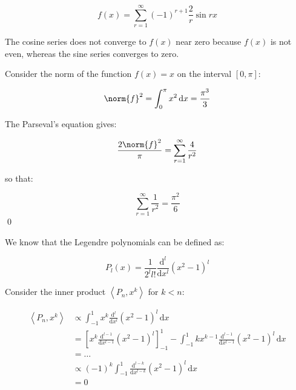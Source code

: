 \documentclass[12pt]{article}
\begin{document}
\begin{equation}
    f(x) = \sum_{r = 1}^{\infty} (-1)^{r + 1} \frac{2}{r} \sin{rx}
\end{equation}

The cosine series does not converge to $f(x)$ near zero because $f(x)$ is not even, whereas the sine series converges to zero.

Consider the norm of the function $f(x) = x$ on the interval $[0, \pi]$:

\begin{equation}
    \norm{f}^{2} = \int_{0}^{\pi} x^{2} \, \mathrm{d}x = \frac{\pi^{3}}{3}
\end{equation}

The Parseval's equation gives:

\begin{equation}
    \frac{2\norm{f}^{2}}{\pi} = \sum_{r = 1}^{\infty} \frac{4}{r^{2}}
\end{equation}

so that:

\begin{equation}
    \sum_{r = 1}^{\infty} \frac{1}{r^{2}} = \frac{\pi^{2}}{6}
\end{equation}
\qed



We know that the Legendre polynomials can be defined as:

\begin{equation}
    P_{l}(x) = \frac{1}{2^{l} l!} \frac{\mathrm{d}^{l}}{\mathrm{d}x^{l}} (x^{2} - 1)^{l}
\end{equation}

Consider the inner product $\left\langle P_{n}, x^{k} \right\rangle$ for $k < n$:

\begin{equation}
\begin{split}
    \left\langle P_{n}, x^{k} \right\rangle &\propto \int_{-1}^{1} x^{k} \frac{\mathrm{d}^{l}}{\mathrm{d}x^{l}} (x^{2} - 1)^{l} \, \mathrm{d}x \\
    &= \left[ x^{k} \frac{\mathrm{d}^{l - 1}}{\mathrm{d}x^{l - 1}} (x^{2} - 1)^{l} \right]_{-1}^{1} - \int_{-1}^{1} k x^{k - 1} \frac{\mathrm{d}^{l - 1}}{\mathrm{d}x^{l - 1}} (x^{2} - 1)^{l} \, \mathrm{d}x \\
    &= \dots \\
    &\propto (-1)^{k} \int_{-1}^{1} \frac{\mathrm{d}^{l - k}}{\mathrm{d}x^{l - k}} (x^{2} - 1)^{l} \, \mathrm{d}x \\
    &= 0
\end{split}
\end{equation}
\end{document}
